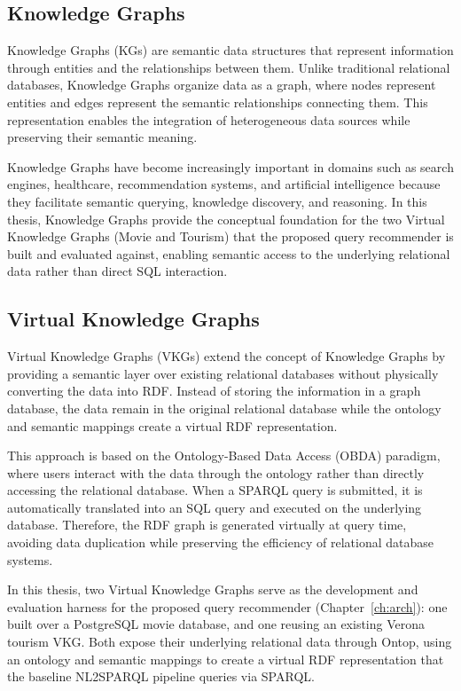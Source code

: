 \subsection{Knowledge Graphs}
Knowledge Graphs (KGs) are semantic data structures that represent information through entities and the relationships between them. Unlike traditional relational databases, Knowledge Graphs organize data as a graph, where nodes represent entities and edges represent the semantic relationships connecting them. This representation enables the integration of heterogeneous data sources while preserving their semantic meaning.

Knowledge Graphs have become increasingly important in domains such as search engines, healthcare, recommendation systems, and artificial intelligence because they facilitate semantic querying, knowledge discovery, and reasoning. In this thesis, Knowledge Graphs provide the conceptual foundation for the two Virtual Knowledge Graphs (Movie and Tourism) that the proposed query recommender is built and evaluated against, enabling semantic access to the underlying relational data rather than direct SQL interaction.

\subsection{Virtual Knowledge Graphs}
Virtual Knowledge Graphs (VKGs) extend the concept of Knowledge Graphs by providing a semantic layer over existing relational databases without physically converting the data into RDF. Instead of storing the information in a graph database, the data remain in the original relational database while the ontology and semantic mappings create a virtual RDF representation.

This approach is based on the Ontology-Based Data Access (OBDA) paradigm, where users interact with the data through the ontology rather than directly accessing the relational database. When a SPARQL query is submitted, it is automatically translated into an SQL query and executed on the underlying database. Therefore, the RDF graph is generated virtually at query time, avoiding data duplication while preserving the efficiency of relational database systems.

In this thesis, two Virtual Knowledge Graphs serve as the development and evaluation harness for the proposed query recommender (Chapter~\ref{ch:arch}): one built over a PostgreSQL movie database, and one reusing an existing Verona tourism VKG. Both expose their underlying relational data through Ontop, using an ontology and semantic mappings to create a virtual RDF representation that the baseline NL2SPARQL pipeline queries via SPARQL.

